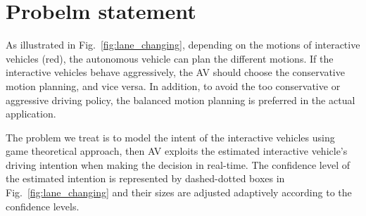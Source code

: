 \documentclass[10pt,journal]{IEEEtran}
\begin{document}
	

	\section{Probelm statement}
	\label{sec:problem_statement}
	
	As illustrated in Fig.~\ref{fig:lane_changing}, depending on the motions of interactive vehicles (red), the autonomous vehicle can plan the different motions. If the interactive vehicles behave aggressively, the AV should choose the conservative motion planning, and vice versa. In addition, to avoid the too conservative or aggressive driving policy, the balanced motion planning is preferred in the actual application.
	
	The problem we treat is to model the intent of the interactive vehicles using game theoretical approach, then AV exploits the estimated interactive vehicle's driving intention when making the decision in real-time. The confidence level of the estimated intention is represented by dashed-dotted boxes in Fig.~\ref{fig:lane_changing} and their sizes are adjusted adaptively according to the confidence levels.
\end{document}
